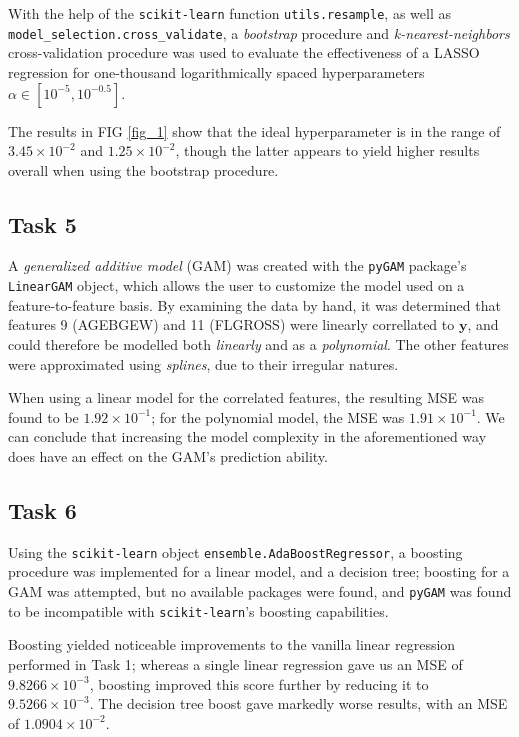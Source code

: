 \documentclass[twoside,twocolumn,10pt]{revtex4-1}
\begin{document}
	With the help of the \texttt{scikit-learn} function \texttt{utils.resample}, as well as \texttt{model\_selection.cross\_validate}, a \textit{bootstrap} procedure and \textit{k-nearest-neighbors} cross-validation procedure was used to evaluate the effectiveness of a LASSO regression for one-thousand logarithmically spaced hyperparameters $\alpha \in [10^{-5}, 10^{-0.5}]$.  
	
	The results in FIG \ref{fig_1} show that the ideal hyperparameter is in the range of $3.45 \times 10^{-2}$ and $1.25 \times 10^{-2}$, though the latter appears to yield higher results overall when using the bootstrap procedure.
	
	\subsection*{Task 5}
	
	 A \textit{generalized additive model} (GAM) was created with the \texttt{pyGAM} package's \texttt{LinearGAM} object, which allows the user to customize the model used on a feature-to-feature basis.  By examining the data by hand, it was determined that features 9 (AGEBGEW) and 11 (FLGROSS) were linearly correllated to $\mathbf{y}$, and could therefore be modelled both \textit{linearly} and as a \textit{polynomial}.  The other features were approximated using \textit{splines}, due to their irregular natures.
	 
	 When using a linear model for the correlated features, the resulting MSE was found to be $1.92 \times 10^{-1}$; for the polynomial model, the MSE was $1.91 \times 10^{-1}$. We can conclude that increasing the model complexity in the aforementioned way does have an effect on the GAM's prediction ability.
	 
	 \subsection*{Task 6}
	 
	 Using the \texttt{scikit-learn} object \texttt{ensemble.AdaBoostRegressor}, a boosting procedure was implemented for a linear model, and a decision tree; boosting for a GAM was attempted, but no available packages were found, and \texttt{pyGAM} was found to be incompatible with \texttt{scikit-learn}'s boosting capabilities.
	 
	 Boosting yielded noticeable improvements to the vanilla linear regression performed in Task 1; whereas a single linear regression gave us an MSE of $9.8266 \times 10^{-3}$, boosting improved this score further by reducing it to $9.5266 \times 10^{-3}$.  The decision tree boost gave markedly worse results, with an MSE of $1.0904 \times 10^{-2}$.
\end{document}
